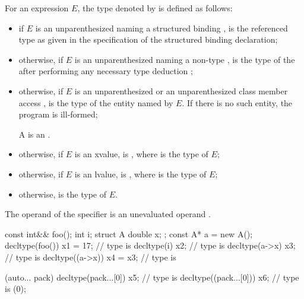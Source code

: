 \documentclass{wg21}
\begin{document}
\pnum
{}%
For an expression $E$, the type denoted by  is defined as follows:
\begin{itemize}
\item if $E$ is an unparenthesized 
naming a structured binding ,
 is the referenced type as given in
the specification of the structured binding declaration;

\item otherwise, if $E$ is an unparenthesized 
naming a non-type  ,
 is the type of the 
after performing any necessary
type deduction ;

\item otherwise, if $E$ is an unparenthesized  or
an unparenthesized
class
member access ,  is the
type of the entity named by $E$.
If there is no such entity, the program is ill-formed;

\begin{addedblock}
\begin{note}
A  is an .
\end{note}
\end{addedblock}

\item otherwise, if $E$ is
an xvalue,  is , where  is the type
of $E$;

\item otherwise, if $E$ is an lvalue, 
is , where  is the type of $E$;

\item otherwise,  is the type of $E$.
\end{itemize}

The operand of the  specifier is an unevaluated
operand .

\begin{example}
    \begin{codeblock}
        const int&& foo();
        int i;
        struct A { double x; };
        const A* a = new A();
        decltype(foo()) x1 = 17;        // type is 
        decltype(i) x2;                 // type is 
        decltype(a->x) x3;              // type is 
        decltype((a->x)) x4 = x3;       // type is 
        \end{codeblock}
        \begin{addedblock}
        \begin{codeblock}
        [](auto... pack){
            decltype(pack...[0])   x5;  // type is 
            decltype((pack...[0])) x6;  // type is 
        }(0);
        \end{codeblock}
        \end{addedblock}
\end{example}
\end{document}
